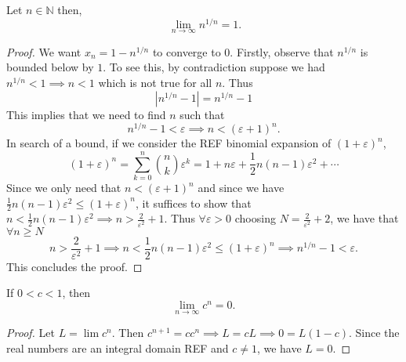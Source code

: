 \documentclass[../main.tex]{subfiles}
\begin{document}
    
    
    
    
    
    
    
    
    
    
    
    \begin{exercise} \label{ex: nth root limit}
    Let \(n \in \mathbb{N}\) then,
    \[
    \ \lim_{n \to \infty}{n^{1/n}} = 1.
    \]
    \end{exercise}
    
    
    
\begin{proof} We want $x_n = 1 - n^{1/n}$ to converge to $0$. Firstly, observe that $n^{1/n}$ is bounded below by $1$. To see this, by contradiction suppose we had $n^{1/n} < 1 \implies n < 1$ which is not true for all $n$. Thus
\[
|n^{1/n} - 1| = n^{1/n} - 1
\]
This implies that we need to find $n$ such that \[
n^{1/n} - 1 < \varepsilon \implies n < (\varepsilon + 1)^n.
\]
In search of a bound, if we consider the REF binomial expansion of $(1+\varepsilon)^n$, 
\[
(1+\varepsilon)^n = \sum_{k=0}^{n}{\binom{n}{k}\varepsilon^k} = 1 + n\varepsilon + \frac{1}{2}n(n-1)\varepsilon^2 + \cdots 
\]
Since we only need that $n < (\varepsilon + 1)^n$ and since we have $\frac{1}{2}n(n-1)\varepsilon^2 \leq (1+\varepsilon)^n$,
it suffices to show that $n < \frac{1}{2}n(n-1)\varepsilon^2 \implies n > \frac{2}{\varepsilon^2} + 1$. Thus $\forall \varepsilon > 0$ choosing $N = \frac{2}{\varepsilon^2} + 2$, we have that $\forall n \geq N$
\[
n > \frac{2}{\varepsilon^2} + 1 \implies n < \frac{1}{2}n(n-1)\varepsilon^2 \leq (1+\varepsilon)^n \implies n^{1/n} - 1 < \varepsilon.
\]
This concludes the proof.

\end{proof}
    
    
    
    
    
    
    
    
    
    \begin{exercise} \label{ex: limit of c^n}
    If $0<c<1$, then 
        \[
        \lim_{n \to \infty} c^n = 0.
        \]
    \end{exercise}

\begin{proof}
Let $L = \lim{c^n}$. Then $c^{n+1} = cc^n \implies L = cL \implies 0 = L(1-c).$ Since the real numbers are an integral domain REF and $ c \neq 1$, we have $L = 0$. 
\end{proof}
    
\end{document}
